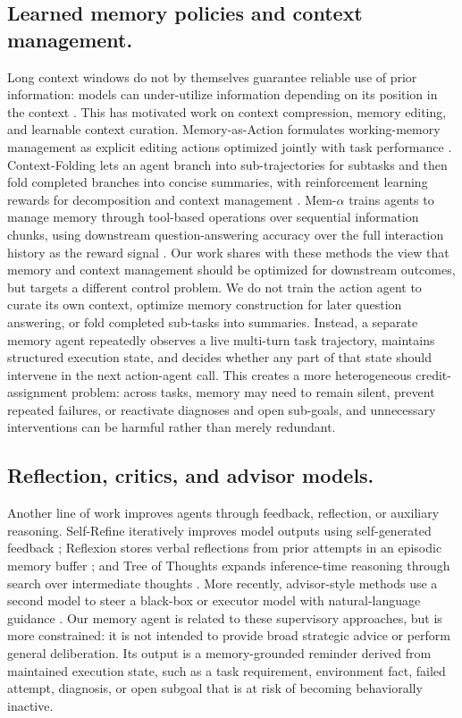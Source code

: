 \subsection{Learned memory policies and context management.}
Long context windows do not by themselves guarantee reliable use of prior information: models can under-utilize information depending on its position in the context \citep{liu2024lost}. This has motivated work on context compression, memory editing, and learnable context curation. Memory-as-Action formulates working-memory management as explicit editing actions optimized jointly with task performance \citep{zhang2025memact}. Context-Folding lets an agent branch into sub-trajectories for subtasks and then fold completed branches into concise summaries, with reinforcement learning rewards for decomposition and context management \citep{sun2025contextfolding}. Mem-$\alpha$ trains agents to manage memory through tool-based operations over sequential information chunks, using downstream question-answering accuracy over the full interaction history as the reward signal \citep{wang2025memalpha}. Our work shares with these methods the view that memory and context management should be optimized for downstream outcomes, but targets a different control problem. We do not train the action agent to curate its own context, optimize memory construction for later question answering, or fold completed sub-tasks into summaries. Instead, a separate memory agent repeatedly observes a live multi-turn task trajectory, maintains structured execution state, and decides whether any part of that state should intervene in the next action-agent call. This creates a more heterogeneous credit-assignment problem: across tasks, memory may need to remain silent, prevent repeated failures, or reactivate diagnoses and open sub-goals, and unnecessary interventions can be harmful rather than merely redundant.

\subsection{Reflection, critics, and advisor models.}
Another line of work improves agents through feedback, reflection, or auxiliary reasoning. Self-Refine iteratively improves model outputs using self-generated feedback \citep{madaan2023selfrefine}; Reflexion stores verbal reflections from prior attempts in an episodic memory buffer \citep{shinn2023reflexion}; and Tree of Thoughts expands inference-time reasoning through search over intermediate thoughts \citep{yao2023tree}. More recently, advisor-style methods use a second model to steer a black-box or executor model with natural-language guidance \citep{asawa2025advisor,anthropic2026advisor}. Our memory agent is related to these supervisory approaches, but is more constrained: it is not intended to provide broad strategic advice or perform general deliberation. Its output is a memory-grounded reminder derived from maintained execution state, such as a task requirement, environment fact, failed attempt, diagnosis, or open subgoal that is at risk of becoming behaviorally inactive.

